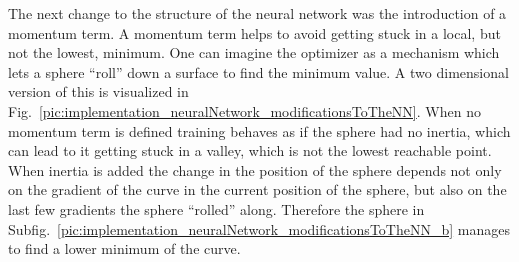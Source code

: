 The next change to the structure of the neural network was the introduction of a momentum term. A momentum term helps to avoid getting stuck in a local, but not the lowest, minimum. One can imagine the optimizer as a mechanism which lets a sphere ``roll'' down a surface to find the minimum value. A two dimensional version of this is visualized in Fig.~\ref{pic:implementation_neuralNetwork_modificationsToTheNN}. When no momentum term is defined training behaves as if the sphere had no inertia, which can lead to it getting stuck in a valley, which is not the lowest reachable point. When inertia is added the change in the position of the sphere depends not only on the gradient of the curve in the current position of the sphere, but also on the last few gradients the sphere ``rolled'' along. Therefore the sphere in Subfig.~\ref{pic:implementation_neuralNetwork_modificationsToTheNN_b} manages to find a lower minimum of the curve.

